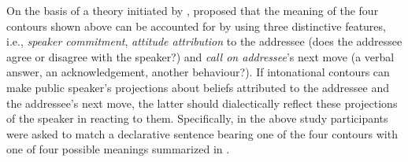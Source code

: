 \documentclass[output=paper,colorlinks,citecolor=brown]{langscibook}
\begin{document}
On the basis of a theory initiated by \citet{beymar2007}, \citet{portesetal2014} proposed that the meaning of the four contours shown above can be accounted for by using three distinctive features, i.e., \textit{speaker commitment}, \textit{attitude attribution} to the addressee (does the addressee agree or disagree with the speaker?) and \textit{call on addressee}'s next move (a verbal answer, an acknowledgement, another behaviour?). If intonational contours can make public speaker's projections about beliefs attributed to the addressee and the addressee's next move, the latter should dialectically reflect these projections of the speaker in reacting to them. Specifically, in the above study participants were asked to match a declarative sentence bearing one of the four contours with one of four possible meanings summarized in .
\end{document}
